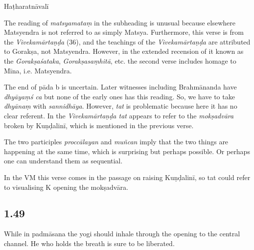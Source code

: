 \begin{ekdosis}
\begin{testimonia}[hp01_048]
Haṭharatnāvalī

\begin{versinnote}
\end{versinnote}

\end{testimonia}

\begin{philcomm}[hp01_048]
The reading of \emph{matsyamataṃ} in the subheading is unusual because elsewhere Matsyendra is not referred to as simply Matsya. Furthermore, this verse is from the \emph{Vivekamārtaṇḍa} (36), and the teachings of the \emph{Vivekamārtaṇḍa} are attributed to Gorakṣa, not Matsyendra. However, in the extended recension of it known as the  \emph{Gorakṣaśataka},  \emph{Gorakṣasaṃhitā}, etc. the second verse includes homage to Mīna, i.e. Matsyendra.

The end of pāda b is uncertain. Later witnesses including Brahmānanda have \emph{dhyāyaṃś ca} but none of the early ones has this reading. So, we have to take \emph{dhyānaṃ} with \emph{sannidhāya}. However, \emph{tat} is problematic because here it has no clear referent. In the \emph{Vivekamārtaṇḍa tat} appears to refer to the \emph{mokṣadvāra} broken by Kuṇḍalinī, which is mentioned in the previous verse.

The two participles \emph{proccālayan} and \emph{muñcan} imply that the two things are happening at the same time, which is surprising but perhaps possible. Or perhaps one can understand them as sequential.

In the VM this verse comes in the passage on raising Kuṇḍalinī, so tat could refer to visualising K opening the mokṣadvāra.
\end{philcomm}

\subsection*{1.49}
\begin{translation}[hp01_049]
While in padmāsana the yogi should inhale through the opening to the central channel. He who holds the breath is sure to be liberated.
\end{translation}


\end{ekdosis}
